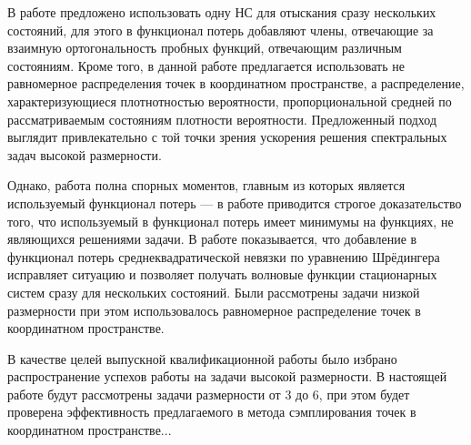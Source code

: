 В работе \cite{li_et_al_2021} предложено использовать одну НС для отыскания сразу нескольких состояний, для этого в функционал потерь добавляют члены, отвечающие за взаимную ортогональность пробных функций, отвечающим различным состояниям. Кроме того, в данной работе предлагается использовать не равномерное распределения точек в координатном пространстве, а распределение, характеризующиеся плотнотностью вероятности, пропорциональной средней по рассматриваемым состояниям плотности вероятности. Предложенный подход выглядит привлекательно с той точки зрения ускорения решения спектральных задач высокой размерности. 

Однако, работа \cite{li_et_al_2021} полна спорных моментов, главным из которых является используемый функционал потерь --- в работе \cite{erdem_2022} приводится строгое доказательство того, что используемый в \cite{li_et_al_2021} функционал потерь имеет минимумы на функциях, не являющихся решениями задачи. В работе \cite{erdem_2022} показывается, что добавление в функционал потерь среднеквадратической невязки по уравнению Шрёдингера исправляет ситуацию и позволяет получать волновые функции стационарных систем сразу для нескольких состояний. Были рассмотрены задачи низкой размерности при этом использовалось равномерное распределение точек в координатном пространстве. 

В качестве целей выпускной квалификационной работы было избрано распространение успехов работы \cite{erdem_2022} на задачи высокой размерности. В настоящей работе будут рассмотрены задачи размерности от 3 до 6, при этом будет проверена эффективность предлагаемого в \cite{li_et_al_2021} метода сэмплирования точек в координатном пространстве...

